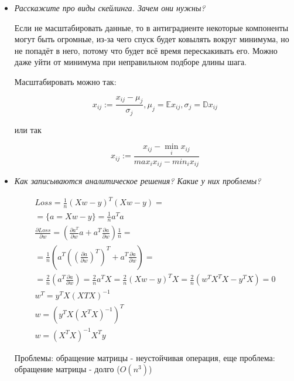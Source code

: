 \documentclass[a4paper]{article}
\begin{document}
\begin{itemize}
\item \textit{Расскажите про виды скейлинга. Зачем они нужны?}

Если не масштабировать данные, то в антиградиенте некоторые компоненты могут быть огромные, из-за чего спуск будет ковылять вокруг минимума, но не попадёт в него, потому что будет всё время перескакивать его. Можно даже уйти от минимума при неправильном подборе длины шага.

Масштабировать можно так:

\[ x_{ij} := \frac{x_{ij} - \mu_j}{\sigma_j}, \mu_j = \mathbb{E} x_{ij}, \sigma_j = \mathbb{D} x_{ij} \]

или так 

\[ x_{ij} := \frac{x_{ij} - \min_i x_{ij}}{max_i x_{ij} - min_i x_{ij}} \]

\item \textit{Как записываются аналитическое решения? Какие у них проблемы?}

\begin{equation}
\begin{gathered}
Loss = \frac{1}{n} (Xw -y)^T (Xw - y) = \\
= \{ a = Xw - y \} = \frac{1}{n} a^T a \\
\frac{\partial Loss}{\partial w} = \left( \frac{\partial a^T}{\partial w} a + a^T \frac{\partial a}{\partial w} \right) \frac{1}{n} = \\
= \frac{1}{n} \left( a^T \left( \left( \frac{\partial a}{\partial w} \right)^T \right)^T + a^T \frac{\partial a}{\partial w} \right) =  \\
= \frac{2}{n} \left( a^T \frac{\partial a}{\partial w} \right) = \frac{2}{n} a^T X = \frac{2}{n} \left( Xw-y \right)^T X = \frac{2}{n} \left( w^TX^TX-y^TX \right) = 0\\
w^T = y^TX (XTX)^{-1} \\
w = \left( y^TX (X^TX)^{-1} \right)^T\\
w = (X^TX)^{-1}X^Ty
\end{gathered}
\end{equation}

Проблемы: обращение матрицы - неустойчивая операция, еще проблема: обращение матрицы - долго ($O(n^3)$)

\end{itemize}
\end{document}
